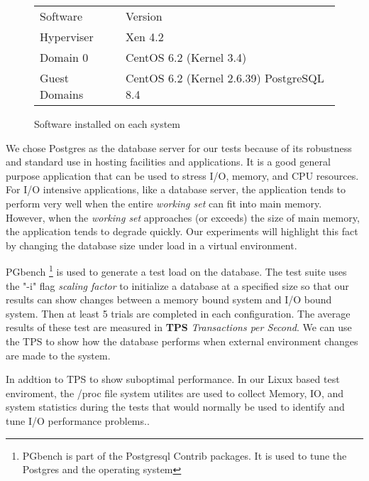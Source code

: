 \begin{figure}[h!]
\begin{tabular}{ l p{5cm} }
  Software & Version \\
  Hyperviser & Xen 4.2 \\
  Domain 0 & CentOS 6.2 (Kernel 3.4) \\
  Guest Domains & CentOS 6.2 (Kernel 2.6.39) PostgreSQL 8.4 \\
\end{tabular}
\caption{Software installed on each system}
\label{fig:softStack}
\end{figure}

We chose Postgres as the database server for our tests because of its robustness and standard use in hosting facilities and applications.  It is a good general purpose application that can be used to stress I/O, memory, and CPU resources.  For I/O intensive applications, like a database server, the application tends to perform very well when the entire \emph{working set} can fit into main memory.  However, when the \emph{working set}  approaches (or exceeds) the size of main memory, the application tends to degrade quickly.  Our experiments will highlight this fact by changing the database size under load in a virtual environment.
\newline

PGbench \footnote{PGbench is part of the Postgresql Contrib packages.  It is used to tune the Postgres and the operating system} is used to generate a test load on the database.  The test suite uses the "-i" flag \emph{scaling factor} to initialize a database at a specified size so that our results can show changes between a memory bound system and I/O bound system.  Then at least 5 trials are completed in each configuration.  The average results of these test are measured in \textbf{TPS} \emph{Transactions per Second}.   We can use the TPS to show how the database performs when external environment changes are made to the system.
\newline

In addtion to TPS to show suboptimal performance.  In our Lixux based test enviroment, the /proc file system utilites are used to collect Memory, IO, and system statistics during the tests that would normally be used to identify and tune I/O performance problems.\cite{suseIO,pgTune}.   

